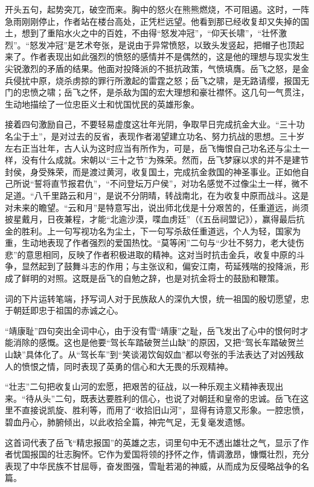 \documentclass[letterpaper,12pt,english]{sphinxmanual}
\begin{document}
开头五句，起势突兀，破空而来。胸中的怒火在熊熊燃烧，不可阻遏。这时，一阵急雨刚刚停止，作者站在楼台高处，正凭栏远望。他看到那已经收复却又失掉的国土，想到了重陷水火之中的百姓，不由得“怒发冲冠”，“仰天长啸”，“壮怀激烈”。“怒发冲冠”是艺术夸张，是说由于异常愤怒，以致头发竖起，把帽子也顶起来了。作者表现出如此强烈的愤怒的感情并不是偶然的，这是他的理想与现实发生尖锐激烈的矛盾的结果。他面对投降派的不抵抗政策，气愤填膺。岳飞之怒，是金兵侵扰中原，烧杀虏掠的罪行所激起的雷霆之怒；岳飞之啸，是无路请缨，报国无门的忠愤之啸；岳飞之怀，是杀敌为国的宏大理想和豪壮襟怀。这几句一气贯注，生动地描绘了一位忠臣义士和忧国忧民的英雄形象。

接着四句激励自己，不要轻易虚度这壮年光阴，争取早日完成抗金大业。“三十功名尘于土”，是对过去的反省，表现作者渴望建立功名、努力抗战的思想。三十岁左右正当壮年，古人认为这时应当有所作为，可是，岳飞悔恨自己功名还与尘土一样，没有什么成就。宋朝以“三十之节”为殊荣。然而，岳飞梦寐以求的并不是建节封侯，身受殊荣，而是渡过黄河，收复国土，完成抗金救国的神圣事业。正如他自己所说“誓将直节报君仇”，“不问登坛万户侯”，对功名感觉不过像尘土一样，微不足道。“八千里路云和月”，是说不分阴晴，转战南北，在为收复中原而战斗。这是对未来的瞻望。“云和月”是特意写出，说出师北伐是十分艰苦的，任重道远，尚须披星戴月，日夜兼程，才能“北逾沙漠，喋血虏廷”（《五岳祠盟记》），赢得最后抗金的胜利。上一句写视功名为尘土，下一句写杀敌任重道远，个人为轻，国家为重，生动地表现了作者强烈的爱国热忱。“莫等闲”二句与“少壮不努力，老大徒伤悲”的意思相同，反映了作者积极进取的精神。这对当时抗击金兵，收复中原的斗争，显然起到了鼓舞斗志的作用；与主张议和，偏安江南，苟延残喘的投降派，形成了鲜明的对照。这既是岳飞的自勉之辞，也是对抗金将士的鼓励和鞭策。

词的下片运转笔端，抒写词人对于民族敌人的深仇大恨，统一祖国的殷切愿望，忠于朝廷即忠于祖国的赤诚之心。

“靖康耻”四句突出全词中心，由于没有雪“靖康”之耻，岳飞发出了心中的恨何时才能消除的感慨。这也是他要“驾长车踏破贺兰山缺”的原因，又把“驾长车踏破贺兰山缺”具体化了。从“驾长车”到“笑谈渴饮匈奴血”都以夸张的手法表达了对凶残敌人的愤恨之情，同时表现了英勇的信心和大无畏的乐观精神。

“壮志”二句把收复山河的宏愿，把艰苦的征战，以一种乐观主义精神表现出来。“待从头”二句，既表达要胜利的信心，也说了对朝廷和皇帝的忠诚。岳飞在这里不直接说凯旋、胜利等，而用了“收拾旧山河”，显得有诗意又形象。一腔忠愤，碧血丹心，肺腑倾出，以此收拾全篇，神完气足，无复毫发遗憾。

这首词代表了岳飞“精忠报国”的英雄之志，词里句中无不透出雄壮之气，显示了作者忧国报国的壮志胸怀。它作为爱国将领的抒怀之作，情调激昂，慷慨壮烈，充分表现了中华民族不甘屈辱，奋发图强，雪耻若渴的神威，从而成为反侵略战争的名篇。
\end{document}
